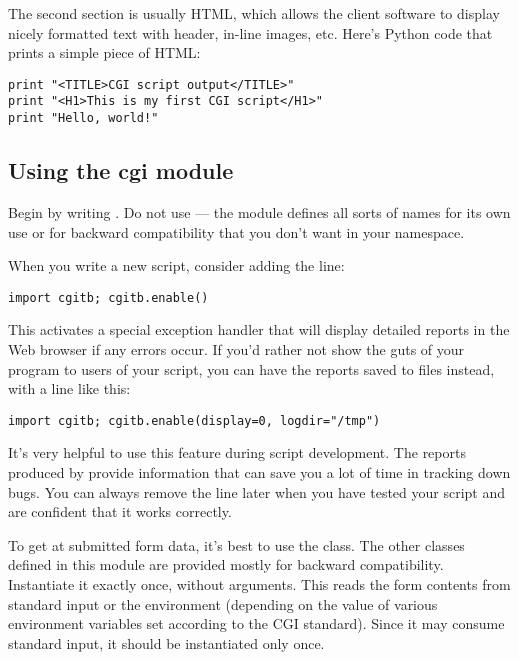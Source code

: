 The second section is usually HTML, which allows the client software
to display nicely formatted text with header, in-line images, etc.
Here's Python code that prints a simple piece of HTML:

\begin{verbatim}
print "<TITLE>CGI script output</TITLE>"
print "<H1>This is my first CGI script</H1>"
print "Hello, world!"
\end{verbatim}

\subsection{Using the cgi module}

Begin by writing .  Do not use  --- the module defines all sorts of names for its own use or for
backward compatibility that you don't want in your namespace.

When you write a new script, consider adding the line:

\begin{verbatim}
import cgitb; cgitb.enable()
\end{verbatim}

This activates a special exception handler that will display detailed
reports in the Web browser if any errors occur.  If you'd rather not
show the guts of your program to users of your script, you can have
the reports saved to files instead, with a line like this:

\begin{verbatim}
import cgitb; cgitb.enable(display=0, logdir="/tmp")
\end{verbatim}

It's very helpful to use this feature during script development.
The reports produced by  provide information that
can save you a lot of time in tracking down bugs.  You can always
remove the  line later when you have tested your script
and are confident that it works correctly.

To get at submitted form data,
it's best to use the  class.  The other classes
defined in this module are provided mostly for backward compatibility.
Instantiate it exactly once, without arguments.  This reads the form
contents from standard input or the environment (depending on the
value of various environment variables set according to the CGI
standard).  Since it may consume standard input, it should be
instantiated only once.

